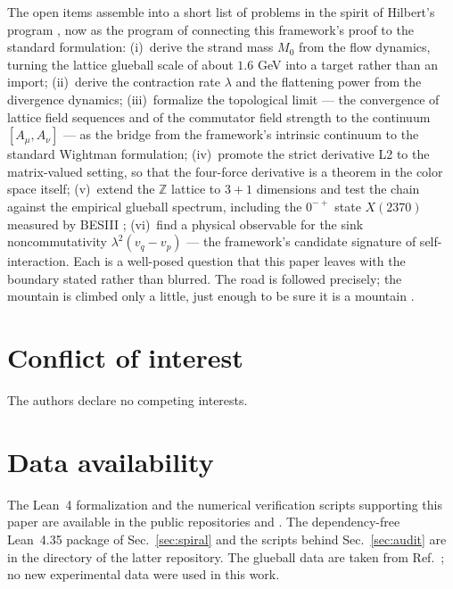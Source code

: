 \documentclass[aps,prd,preprint,superscriptaddress,amsmath,amssymb]{revtex4-2}
\begin{document}
The open items assemble into a short list of problems in the spirit
of Hilbert's program \cite{hilbert1900mathematische}, now as the
program of connecting this framework's proof to the standard
formulation: (i)~derive the strand mass $M_0$ from the flow
dynamics, turning the lattice glueball scale of about $1.6$ GeV into
a target rather than an import; (ii)~derive the contraction rate
$\lambda$ and the flattening power from the divergence dynamics;
(iii)~formalize the topological limit --- the convergence of lattice
field sequences and of the commutator field strength to the
continuum $[A_\mu,A_\nu]$ --- as the bridge from the framework's
intrinsic continuum to the standard Wightman formulation; (iv)~promote
the strict derivative L2 to the matrix-valued setting, so that the
four-force derivative is a theorem in the color space itself;
(v)~extend the $\mathbb{Z}$ lattice to $3{+}1$ dimensions and test
the chain against the empirical glueball spectrum, including the
$0^{-+}$ state $X(2370)$ measured by BESIII
\cite{morningstar1999glueball,chen2006glueball,besiii2026lightest};
(vi)~find a physical observable for the sink noncommutativity
$\lambda^2(v_q-v_p)$ --- the framework's candidate signature of
self-interaction.  Each is a well-posed question that this paper
leaves with the boundary stated rather than blurred.  The road is
followed precisely; the mountain is climbed only a little, just
enough to be sure it is a mountain
\cite{hilbert1900mathematische,ProjectionPhysics}.

\section*{Conflict of interest}
The authors declare no competing interests.

\section*{Data availability}
The Lean~4 formalization and the numerical verification scripts
supporting this paper are available in the public repositories
 and
.  The dependency-free Lean~4.35
package of Sec.~\ref{sec:spiral} and the scripts behind Sec.~\ref{sec:audit}
are in the directory  of the latter repository.  The
glueball data are taken from Ref.~\cite{athenodorou2020glueball}; no new
experimental data were used in this work.


\end{document}
